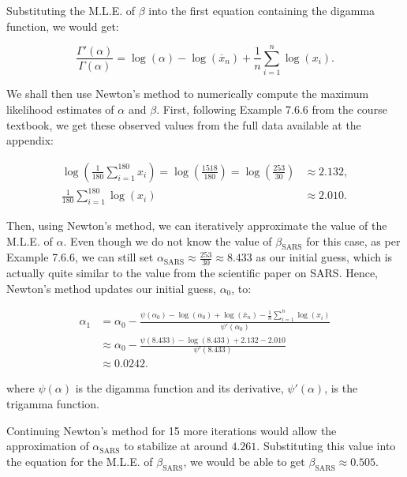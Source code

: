 \documentclass[11pt,fancychapters]{article}
\begin{document}
Substituting the M.L.E. of $\beta$ into the first equation containing the digamma function, we would get:

\begin{equation}\label{eqn1b6}
    \frac{\Gamma'(\alpha)}{\Gamma(\alpha)} = \log{(\alpha)} - \log{(\overline{x}_n)} + \frac{1}{n} \sum_{i=1}^n \log{(x_i)}.
\end{equation}

We shall then use Newton's method to numerically compute the maximum likelihood estimates of $\alpha$ and $\beta$. First, following Example 7.6.6 from the course textbook, we get these observed values from the full data available at the appendix:

\begin{equation}\label{eqn1b7}
\begin{split}
    \log \left( \frac{1}{180} \sum_{i=1}^{180} x_i \right) = \log \left( \frac{1518}{180} \right) = \log \left( \frac{253}{30} \right) & \approx 2.132, \\
    \frac{1}{180} \sum_{i=1}^{180} \log{(x_i)} & \approx 2.010.
\end{split}
\end{equation}

Then, using Newton's method, we can iteratively approximate the value of the M.L.E. of $\alpha$. Even though we do not know the value of $\beta_\text{SARS}$ for this case, as per Example 7.6.6, we can still set $\alpha_\text{SARS} \approx \frac{253}{30} \approx 8.433$ as our initial guess, which is actually quite similar to the value from the scientific paper on SARS. Hence, Newton's method updates our initial guess, $\alpha_0$, to:

\begin{equation}\label{eqn1b8}
\begin{split}
    \alpha_1 & = \alpha_0 - \frac{\psi(\alpha_0) - \log{(\alpha_0)} + \log{(\overline{x}_n)} - \frac{1}{n} \sum_{i=1}^n \log{(x_i)}}{\psi'(\alpha_0)} \\
    & \approx \alpha_0 - \frac{\psi(8.433) - \log{(8.433)} + 2.132 - 2.010}{\psi'(8.433)} \\
    & \approx 0.0242.
\end{split}
\end{equation}

where $\psi(\alpha)$ is the digamma function and its derivative, $\psi'(\alpha)$, is the trigamma function.\newline

Continuing Newton's method for 15 more iterations would allow the approximation of $\alpha_\text{SARS}$ to stabilize at around $4.261$. Substituting this value into the equation for the M.L.E. of $\beta_\text{SARS}$, we would be able to get $\beta_\text{SARS} \approx 0.505$.
\end{document}
